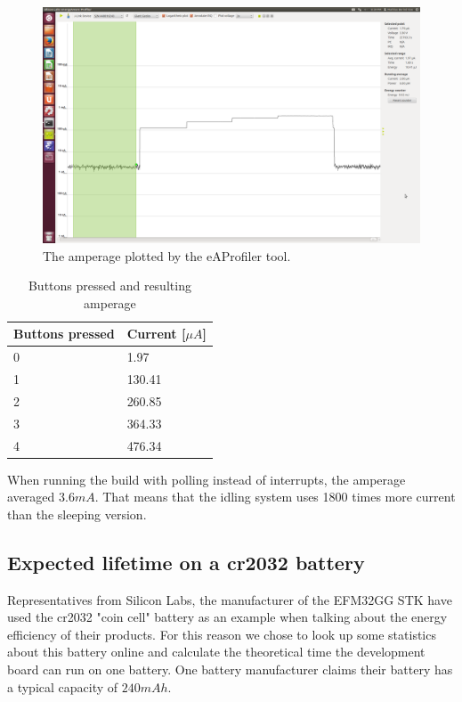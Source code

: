 \begin{figure}[h!]
    \includegraphics[width=\linewidth]{img/0.png}
    \caption{The amperage plotted by the eAProfiler tool.}
    \label{fig:ampsplot}
\end{figure}
\begin{table}[h!]
    \begin{tabular}{l|l}
        Buttons pressed & Current [$\mu A$] \\
	\hline
	0               & 1.97              \\
	1               & 130.41            \\
        2               & 260.85            \\
	3               & 364.33            \\
	4               & 476.34
    \end{tabular}
    \caption{Buttons pressed and resulting amperage \label{tbl:current}}
\end{table}

When running the build with polling instead of interrupts, the amperage averaged $3.6 mA$. That means that the idling system uses 1800 times more current than the sleeping version.

\subsection{Expected lifetime on a cr2032 battery}

Representatives from Silicon Labs, the manufacturer of the EFM32GG STK have used the cr2032 "coin cell" battery as an example when talking about the energy efficiency of their products. For this reason we chose to look up some statistics about this battery online and calculate the theoretical time the development board can run on one battery. One battery manufacturer claims their battery has a typical capacity of $240 mAh$.\cite{cr2032spec}

